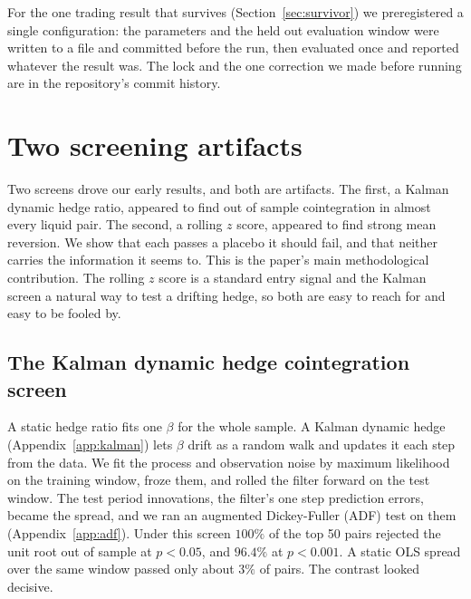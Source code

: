 \documentclass[11pt]{article}
\begin{document}
For the one trading result that survives (Section~\ref{sec:survivor}) we preregistered a single
configuration: the parameters and the held out evaluation window were written to a file and
committed before the run, then evaluated once and reported whatever the result was. The lock and
the one correction we made before running are in the repository's commit history.

\section{Two screening artifacts}
\label{sec:artifacts}

Two screens drove our early results, and both are artifacts. The first, a Kalman dynamic
hedge ratio, appeared to find out of sample cointegration in almost every liquid pair. The
second, a rolling $z$ score, appeared to find strong mean reversion. We show that each passes
a placebo it should fail, and that neither carries the information it seems to. This is the
paper's main methodological contribution. The rolling $z$ score is a standard entry signal and the
Kalman screen a natural way to test a drifting hedge, so both are easy to reach for and easy to be
fooled by.

\subsection{The Kalman dynamic hedge cointegration screen}
\label{sec:kalman}

A static hedge ratio fits one $\beta$ for the whole sample. A Kalman dynamic hedge (Appendix~\ref{app:kalman}) lets
$\beta$ drift as a random walk and updates it each step from the data. We fit the process and
observation noise by maximum likelihood on the training window, froze them, and rolled the
filter forward on the test window. The test period innovations, the filter's one step
prediction errors, became the spread, and we ran an augmented Dickey-Fuller (ADF) test on
them~\cite{saiddickey1984} (Appendix~\ref{app:adf}). Under this screen $100\%$ of the top 50 pairs rejected the unit root out of sample at
$p<0.05$, and $96.4\%$ at $p<0.001$. A static OLS spread over the same window passed only
about $3\%$ of pairs. The contrast looked decisive.
\end{document}
